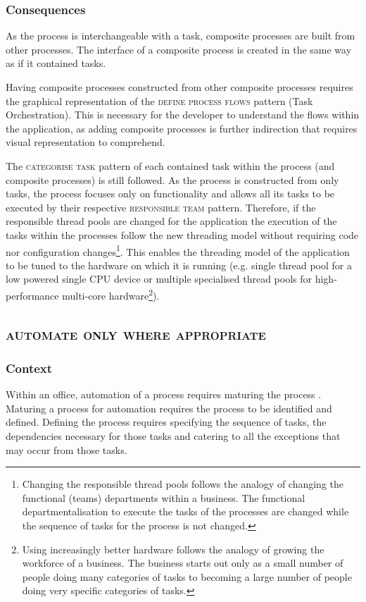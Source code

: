 \documentclass[prodmode]{style/acmlarge}
\begin{document}
\subsubsection*{Consequences} As the process is interchangeable with a task,
composite processes are built from other processes.  The interface of a
composite process is created in the same way as if it contained tasks.

Having composite processes constructed from other composite processes requires
the graphical representation of the \textsc{define process flows} pattern (Task
Orchestration).  This is necessary for the developer to understand the flows
within the application, as adding composite processes is further indirection
that requires visual representation to comprehend.

The \textsc{categorise task} pattern of each contained task within the process
(and composite processes) is still followed.  As the process is constructed from
only tasks, the process focuses only on functionality and allows all its tasks
to be executed by their respective \textsc{responsible team} pattern.
Therefore, if the responsible thread pools are changed for the application the
execution of the tasks within the processes follow the new threading model
without requiring code nor configuration changes\footnote{Changing the
responsible thread pools follows the analogy of changing the functional (teams)
departments within a business.  The functional departmentalisation to execute
the tasks of the processes are changed while the sequence of tasks for the
process is not changed.}.  This enables the threading model of the application
to be tuned to the hardware on which it is running (e.g. single thread pool for a low
powered single CPU device or multiple specialised thread pools for
high-performance multi-core hardware\footnote{Using increasingly better hardware
follows the analogy of growing the workforce of a business.  The business starts
out only as a small number of people doing many categories of tasks to becoming
a large number of people doing very specific categories of tasks.}).



\subsection{\textsc{\textbf{automate only where appropriate}}}

\subsubsection*{Context} Within an office, automation of a process requires
maturing the process \cite{process-maturity-global,bpm-tools}.  Maturing a
process for automation requires the process to be identified and defined. 
Defining the process requires specifying the sequence of tasks, the dependencies
necessary for those tasks and catering to all the exceptions that may occur from
those tasks.
\end{document}
